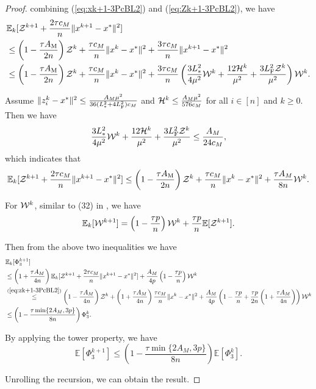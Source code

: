 \documentclass[11pt]{article}
\begin{document}
\begin{proof}
		combining (\ref{eq:xk+1-3PcBL2}) and (\ref{eq:Zk+1-3PcBL2}), we have 
		\begin{align*}
			&\mathbb{E}_k [{\cal Z}^{k+1} + \frac{2\tau c_M}{n} \|x^{k+1} - x^*\|^2] \\
			& \leq \left(  1 - \frac{\tau A_{\rm M}}{2n}  \right) {\cal Z}^k +  \frac{\tau c_M}{n} \|x^k-x^*\|^2 +  \frac{3\tau c_M}{n} \|x^{k+1} - x^*\|^2 \\ 
			& \leq \left(  1 - \frac{\tau A_{\rm M}}{2n}  \right) {\cal Z}^k +  \frac{\tau c_M}{n} \|x^k-x^*\|^2 +  \frac{3\tau c_M}{n} \left(  \frac{3L_{*}^2}{4\mu^2} {\cal W}^k + \frac{12{\cal H}^k}{\mu^2} + \frac{3L_{\rm F}^2{\cal Z}^k}{\mu^2}  \right) {\cal W}^k. 
		\end{align*}
		
		Assume $\|z_i^k-x^*\|^2 \leq \frac{A_M \mu^2}{36(L_{*}^2 + 4L_{\rm F}^2)c_M}$ and ${\cal H}^k \leq \frac{A_M\mu^2}{576c_M}$ for all $i\in [n]$ and $k\geq 0$. Then we have 
		$$
		\frac{3L_{*}^2}{4\mu^2} {\cal W}^k + \frac{12{\cal H}^k}{\mu^2} + \frac{3L_{\rm F}^2{\cal Z}^k}{\mu^2}  \leq \frac{A_M}{24c_M}, 
		$$
		which indicates that 
		\begin{equation}\label{eq:zk+1-3PcBL2}
			\mathbb{E}_k [{\cal Z}^{k+1} + \frac{2\tau c_M}{n} \|x^{k+1} - x^*\|^2] \leq \left(  1 - \frac{\tau A_{\rm M}}{2n}  \right) {\cal Z}^k +  \frac{\tau c_M}{n} \|x^k-x^*\|^2 + \frac{\tau A_M}{8n} {\cal W}^k. 
		\end{equation}
		
		
		For ${\cal W}^k$, similar to (32) in \citep{qian2021basis}, we have 
		$$
		\mathbb{E}_k [{\cal W}^{k+1}] = \left(  1 - \frac{\tau p}{n}  \right) {\cal W}^k + \frac{\tau p}{n} \mathbb{E} [{\cal Z}^{k+1}]. 
		$$
		
		Then from the above two inequalities we have 
		\begin{align*}
			&\mathbb{E}_k[\Phi_3^{k+1}] \\
			& \leq \left(  1 + \frac{\tau A_M}{4n}  \right) \mathbb{E}_k [{\cal Z}^{k+1} + \frac{2\tau c_M}{n}\|x^{k+1}-x^*\|^2] + \frac{A_M}{4p} \left(  1 - \frac{\tau p}{n}  \right) {\cal W}^k \\ 
			& \overset{(\ref{eq:zk+1-3PcBL2})}{\leq} \left(  1 - \frac{\tau A_M}{4n}  \right) {\cal  Z}^k + \left(  1 + \frac{\tau A_M}{4n}  \right) \frac{\tau c_M}{n} \|x^k-x^*\|^2 + \frac{A_M}{4p} \left(  1 - \frac{\tau p}{n} + \frac{\tau p}{2n} \left(  1 + \frac{\tau A_M}{4n}  \right)  \right) {\cal W}^k \\ 
			& \leq \left(  1 - \frac{\tau \min\{  2A_M, 3p  \} }{8n}  \right) \Phi_3^k. 
		\end{align*}
		
		By applying the tower property, we have 
		$$
		\mathbb{E}[\Phi_3^{k+1}] \leq \left(  1 - \frac{\tau \min\{  2A_M, 3p  \} }{8n}  \right) \mathbb{E}[\Phi_3^k]. 
		$$
		
		Unrolling the recursion, we can obtain the result. 
		
	\end{proof}
	
\end{document}
